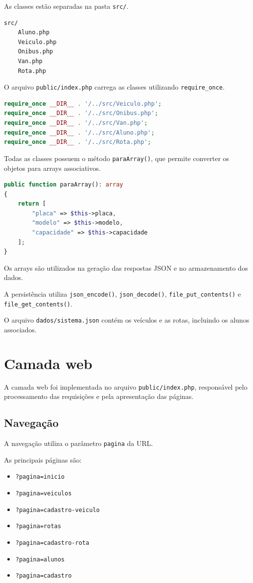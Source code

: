 \documentclass[12pt,a4paper]{article}
\begin{document}
As classes estão separadas na pasta \texttt{src/}.

\begin{lstlisting}
src/
    Aluno.php
    Veiculo.php
    Onibus.php
    Van.php
    Rota.php
\end{lstlisting}

O arquivo \texttt{public/index.php} carrega as classes utilizando \texttt{require\_once}.

\begin{lstlisting}[language=PHP]
require_once __DIR__ . '/../src/Veiculo.php';
require_once __DIR__ . '/../src/Onibus.php';
require_once __DIR__ . '/../src/Van.php';
require_once __DIR__ . '/../src/Aluno.php';
require_once __DIR__ . '/../src/Rota.php';
\end{lstlisting}

Todas as classes possuem o método \texttt{paraArray()}, que permite converter os objetos para arrays associativos.

\begin{lstlisting}[language=PHP]
public function paraArray(): array
{
    return [
        "placa" => $this->placa,
        "modelo" => $this->modelo,
        "capacidade" => $this->capacidade
    ];
}
\end{lstlisting}

Os arrays são utilizados na geração das respostas JSON e no armazenamento dos dados.

A persistência utiliza \texttt{json\_encode()}, \texttt{json\_decode()}, \texttt{file\_put\_contents()} e \texttt{file\_get\_contents()}.

O arquivo \texttt{dados/sistema.json} contém os veículos e as rotas, incluindo os alunos associados.

\section{Camada web}

A camada web foi implementada no arquivo \texttt{public/index.php}, responsável pelo processamento das requisições e pela apresentação das páginas.

\subsection{Navegação}

A navegação utiliza o parâmetro \texttt{pagina} da URL.

As principais páginas são:

\begin{itemize}
    \item \texttt{?pagina=inicio}
    \item \texttt{?pagina=veiculos}
    \item \texttt{?pagina=cadastro-veiculo}
    \item \texttt{?pagina=rotas}
    \item \texttt{?pagina=cadastro-rota}
    \item \texttt{?pagina=alunos}
    \item \texttt{?pagina=cadastro}
\end{itemize}
\end{document}
